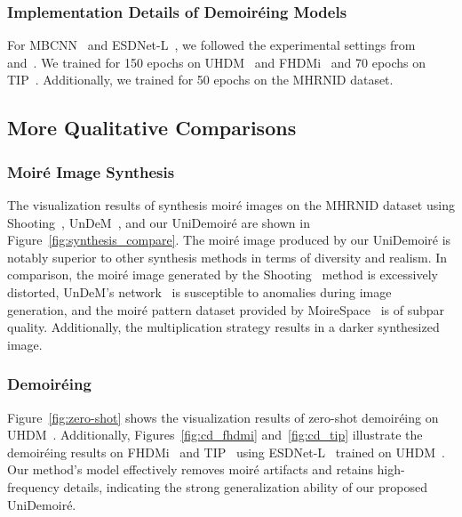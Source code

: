 \subsubsection{Implementation Details of Demoiréing Models}
For MBCNN~\cite{zheng2020image} and ESDNet-L~\cite{yu2022towards}, we followed the experimental settings from~\cite{yu2022towards} and~\cite{undem}. We trained for 150 epochs on UHDM~\cite{yu2022towards} and FHDMi~\cite{he2020fhde} and 70 epochs on TIP~\cite{sun2018moire}. Additionally, we trained for 50 epochs on the MHRNID dataset.



\subsection{More Qualitative Comparisons}

\subsubsection{Moiré Image Synthesis}
The visualization results of synthesis moiré images on the MHRNID dataset using Shooting~\cite{shooting}, UnDeM~\cite{undem}, and our UniDemoiré are shown in Figure~\ref{fig:synthesis_compare}. 
The moiré image produced by our UniDemoiré is notably superior to other synthesis methods in terms of diversity and realism. In comparison, the moiré image generated by the Shooting~\cite{shooting} method is excessively distorted, UnDeM's network~\cite{undem} is susceptible to anomalies during image generation, and the moiré pattern dataset provided by MoireSpace~\cite{yang2023doing} is of subpar quality. Additionally, the multiplication strategy results in a darker synthesized image.


\subsubsection{Demoiréing}
Figure~\ref{fig:zero-shot} shows the visualization results of zero-shot demoiréing on UHDM~\cite{yu2022towards}. Additionally, Figures~\ref{fig:cd_fhdmi} and~\ref{fig:cd_tip} illustrate the demoiréing results on FHDMi~\cite{he2020fhde} and TIP~\cite{sun2018moire} using ESDNet-L~\cite{yu2022towards} trained on UHDM~\cite{yu2022towards}. Our method's model effectively removes moiré artifacts and retains high-frequency details, indicating the strong generalization ability of our proposed UniDemoiré.

